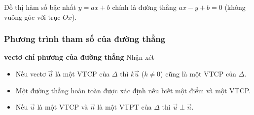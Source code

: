 \begin{note}
	Đồ thị hàm số bậc nhất $y=ax+b$ chính là đường thẳng $ax-y+b=0$ (không vuông góc với trục $Ox$).
\end{note}

\subsubsection{Phương trình tham số của đường thẳng}
\textbf{vectơ chỉ phương của đường thẳng}
		Nhận xét 
		\begin{itemize}
			\item Nếu vectơ $\overrightarrow{u}$  là một VTCP của $\Delta$ thì $k \overrightarrow{u}$ ($k \ne 0 $) cũng là một VTCP của $\Delta$. 
			\item Một đường thẳng hoàn toàn được xác định nếu biết một điểm và một VTCP.
			\item Nếu $\overrightarrow{u}$ là một VTCP và $\overrightarrow{n}$ là một VTPT của $\Delta$ thì $\overrightarrow{u} \perp \overrightarrow{n}$.
		\end{itemize}
		
